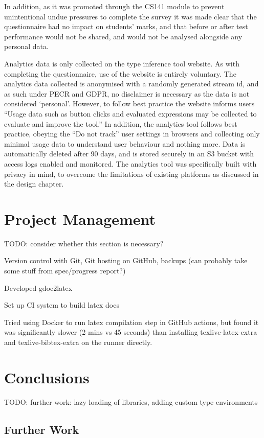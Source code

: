 \documentclass[a4paper,fleqn,12pt]{article}
\begin{document}
In addition, as it was promoted through the CS141 module to prevent unintentional undue pressures to complete the survey it was made clear that the questionnaire had no impact on students’ marks, and that before or after test performance would not be shared, and would not be analysed alongside any personal data.

Analytics data is only collected on the type inference tool website. As with completing the questionnaire, use of the website is entirely voluntary. The analytics data collected is anonymised with a randomly generated stream id, and as such under PECR and GDPR, no disclaimer is necessary as the data is not considered ‘personal’. However, to follow best practice the website informs users “Usage data such as button clicks and evaluated expressions may be collected to evaluate and improve the tool.” In addition, the analytics tool follows best practice, obeying the “Do not track” user settings in browsers and collecting only minimal usage data to understand user behaviour and nothing more. Data is automatically deleted after 90 days, and is stored securely in an S3 bucket with access logs enabled and monitored. The analytics tool was specifically built with privacy in mind, to overcome the limitations of existing platforms as discussed in the design chapter.
\section{Project Management}\label{id:h.3j8xp631ygy}
TODO: consider whether this section is necessary?

Version control with Git, Git hosting on GitHub, backups (can probably take some stuff from spec/progress report?)

Developed gdoc2latex

Set up CI system to build latex docs

Tried using Docker to run latex compilation step in GitHub actions, but found it was significantly slower (2 mins vs 45 seconds) than installing texlive-latex-extra and texlive-bibtex-extra on the runner directly.
\section{Conclusions}\label{id:h.fc67ipatea73}
TODO: further work: lazy loading of libraries, adding custom type environments
\subsection{Further Work}\label{id:h.60yvcrl0lpu}
\end{document}

